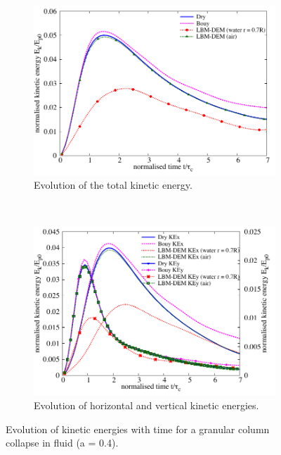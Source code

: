 \begin{figure}
\centering
\begin{subfigure}[t]{0.8\textwidth}
	\centering
    \includegraphics[width=\textwidth]{KE_a04f}
    \caption{Evolution of the total kinetic energy.}
    \label{fig:KE_a04f}
\end{subfigure}
\\
\begin{subfigure}[t]{0.95\textwidth}
	\centering
    \includegraphics[width=\textwidth]{KExy_a04f}
    \caption{Evolution of horizontal and vertical kinetic energies.}
    \label{fig:KExy_a04f}
\end{subfigure}
\caption{Evolution of kinetic energies with time for a granular column collapse 
in fluid (a = 0.4).}
\label{fig:a04f_energy}
\end{figure}

